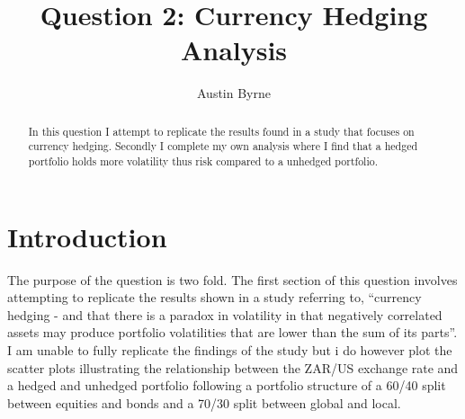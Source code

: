 \documentclass[11pt,preprint, authoryear]{elsarticle}
\numberwithin{equation}{section}
\numberwithin{figure}{section}
\numberwithin{table}{section}
\begin{document}
\begin{frontmatter}  %

\title{Question 2: Currency Hedging Analysis}





\author[Add1]{Austin Byrne}





\address[Add1]{Stellenbosch University, Stellenbosch}


\begin{abstract}
\small{
In this question I attempt to replicate the results found in a study
that focuses on currency hedging. Secondly I complete my own analysis
where I find that a hedged portfolio holds more volatility thus risk
compared to a unhedged portfolio.
}
\end{abstract}

\vspace{1cm}





\vspace{0.5cm}

\end{frontmatter}

\setcounter{footnote}{0}



\pagestyle{fancy}
\chead{}
\rhead{}
\lfoot{}
\lhead{}
\cfoot{}


\headsep 35pt %




\hypertarget{introduction}{%
\section{\texorpdfstring{Introduction
\label{Introduction}}{Introduction }}\label{introduction}}

The purpose of the question is two fold. The first section of this
question involves attempting to replicate the results shown in a study
referring to, ``currency hedging - and that there is a paradox in
volatility in that negatively correlated assets may produce portfolio
volatilities that are lower than the sum of its parts''. I am unable to
fully replicate the findings of the study but i do however plot the
scatter plots illustrating the relationship between the ZAR/US exchange
rate and a hedged and unhedged portfolio following a portfolio structure
of a 60/40 split between equities and bonds and a 70/30 split between
global and local.
\end{document}
